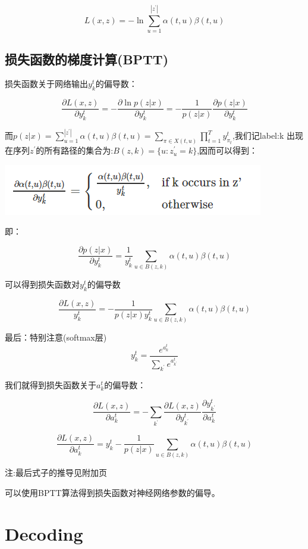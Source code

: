 \documentclass[]{book}
\theoremstyle{definition}
\theoremstyle{definition}
\theoremstyle{definition}
\theoremstyle{remark}
\begin{document}
\[L(x,z) = -\ln \sum_{u=1}^{|z^{'}|}\alpha(t,u)\beta(t,u) \]

\section{损失函数的梯度计算(BPTT)}\label{bptt}

损失函数关于网络输出\(y_{k}^t\)的偏导数：

\[\frac{\partial L(x,z)}{\partial y_k^{t}}=-\frac{\partial \ln p(z|x)}{\partial y_k^{t}}=-\frac{1}{p(z|x)}\frac{\partial p(z|x)}{\partial y_k^{t}}\]

而\(p(z|x)=\sum_{u=1}^{|z^{'}|}\alpha(t,u)\beta(t,u)= \sum_{\pi \in X(t,u)} \prod_{t=1}^Ty_{\pi_t}^t\),我们记label:k
出现在序列\(z^{'}\)的所有路径的集合为:\(B(z,k)=\{u:z_u^{'}=k\}\),因而可以得到：

\begin{center}\includegraphics[width=1.5\linewidth]{pic/fig_7} \end{center}

即：

\[\frac{\partial p(z|x)}{\partial y_k^t}=\frac{1}{y_k^t}\sum_{u \in B(z,k)}\alpha(t,u)\beta(t,u)\]

可以得到损失函数对\(y_{k}^{t}\)的偏导数

\[ \frac{\partial L(x,z)}{y_{k}^{t}} = -\frac{1}{p(z|x)y_{k}^{t}}\sum_{u \in B(z,k)}\alpha(t,u)\beta(t,u)\]

最后：特别注意(softmax层)\[y_k^t = \frac{e^{a_k^t}}{\sum_{k^{'}}e^{a_{k^{'}}^t}}\]

我们就得到损失函数关于\(a_k^t\)的偏导数：

\[\frac{\partial L(x,z)}{\partial a_k^t}= -\sum_{k^{'}}\frac{\partial L(x,z)}{\partial y_{k^{'}}^t}\frac{\partial y_{k^{'}}^t}{\partial a_k^t}\]

\[\frac{\partial L(x,z)}{\partial a_k^t}= y_{k}^t-\frac{1}{p(z|x)}\sum_{u\in B(z,k)}\alpha(t,u)\beta(t,u)\]

注:最后式子的推导见附加页

可以使用BPTT算法得到损失函数对神经网络参数的偏导。

\chapter{Decoding}\label{decoding}
\end{document}
